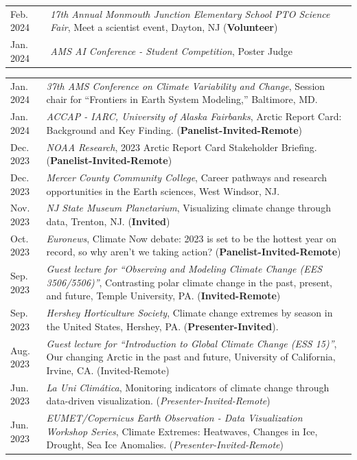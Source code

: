 \documentclass[margin,line,palatino,courier,10pt]{res}
\begin{document}
\begin{resume}
\begin{tabular}{@{}p{0.9in}p{4in}}
Feb. 2024 & \textit{17th Annual Monmouth Junction Elementary School PTO Science Fair}, Meet a scientist event, Dayton, NJ (\textbf{Volunteer})\\
Jan. 2024 & \textit{AMS AI Conference - Student Competition}, Poster Judge\\ 
\end{tabular}
\begin{tabular}{@{}p{0.9in}p{4in}}
Jan. 2024 & \textit{37th AMS Conference on Climate Variability and Change}, Session chair for ``Frontiers in Earth System Modeling,'' Baltimore, MD.\\ 
Jan. 2024 & \textit{ACCAP - IARC, University of Alaska Fairbanks}, Arctic Report Card: Background and Key Finding. (\textbf{Panelist-Invited-Remote})\\
Dec. 2023 & \textit{NOAA Research}, 2023 Arctic Report Card Stakeholder Briefing. (\textbf{Panelist-Invited-Remote})\\
Dec. 2023 & \textit{Mercer County Community College}, Career pathways and research opportunities in the Earth sciences, West Windsor, NJ.\\ 
Nov. 2023 & \textit{NJ State Museum Planetarium}, Visualizing climate change through data, Trenton, NJ. (\textbf{Invited})\\ 
Oct. 2023 & \textit{Euronews}, Climate Now debate: 2023 is set to be the hottest year on record, so why aren't we taking action? (\textbf{Panelist-Invited-Remote})\\
Sep. 2023 & \textit{Guest lecture for ``Observing and Modeling Climate Change (EES 3506/5506)''}, Contrasting polar climate change in the past, present, and future, Temple University, PA. (\textbf{Invited-Remote})\\
Sep. 2023 & \textit{Hershey Horticulture Society}, Climate change extremes by season in the United States, Hershey, PA. (\textbf{Presenter-Invited}).\\
Aug. 2023 & \textit{Guest lecture for ``Introduction to Global Climate Change (ESS 15)''}, Our changing Arctic in the past and future, University of California, Irvine, CA. (Invited-Remote)\\
Jun. 2023 & \textit{La Uni Clim\'{a}tica}, Monitoring indicators of climate change through data-driven visualization. (\textit{Presenter-Invited-Remote})\\
Jun. 2023 & \textit{EUMET/Copernicus Earth Observation - Data Visualization Workshop Series}, Climate Extremes: Heatwaves, Changes in Ice, Drought, Sea Ice Anomalies. (\textit{Presenter-Invited-Remote})\\

\end{tabular}
\end{resume}
\end{document}
